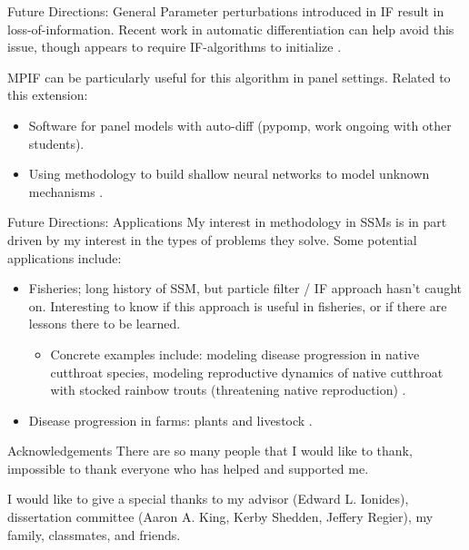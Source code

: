 \documentclass[aspectratio=169]{beamer}\usepackage[]{graphicx}\usepackage[]{xcolor}
\begin{document}
    \begin{frame}{Future Directions: General}
      Parameter perturbations introduced in IF result in loss-of-information. Recent work in automatic differentiation can help avoid this issue, though appears to require IF-algorithms to initialize \citep{tan24}. 
      
      MPIF can be particularly useful for this algorithm in panel settings. Related to this extension: 
      \begin{itemize}
        \item Software for panel models with auto-diff (pypomp, work ongoing with other students).
        \item Using methodology to build shallow neural networks to model unknown mechanisms \citep[e.g.,][]{noordijk24}. 
      \end{itemize}
  \end{frame}

    \begin{frame}{Future Directions: Applications}
      My interest in methodology in SSMs is in part driven by my interest in the types of problems they solve. Some potential applications include: 
      \begin{itemize}
        \item Fisheries; long history of SSM, but particle filter / IF approach hasn't caught on. Interesting to know if this approach is useful in fisheries, or if there are lessons there to be learned.
        \begin{itemize}
          \item Concrete examples include: modeling disease progression in native cutthroat species, modeling reproductive dynamics of native cutthroat with stocked rainbow trouts (threatening native reproduction) \citep{rosenthal22}.
        \end{itemize}
        \item Disease progression in farms: plants and livestock \citep{skolstrup22}.
      \end{itemize}
  \end{frame}
  
  \begin{frame}{Acknowledgements}
    There are so many people that I would like to thank, impossible to thank everyone who has helped and supported me.
    
    I would like to give a special thanks to my advisor (Edward L. Ionides), dissertation committee (Aaron A. King, Kerby Shedden, Jeffery Regier), my family, classmates, and friends.
  \end{frame}
\end{document}
